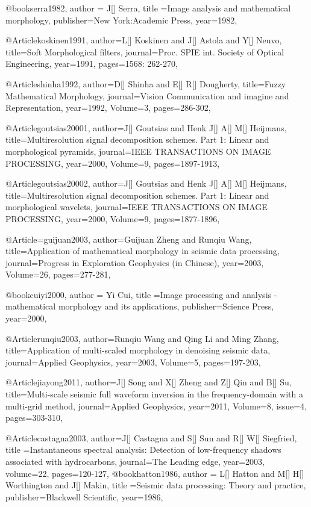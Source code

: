 @book{serra1982,
  author = {J[] Serra},
  title ={Image analysis and mathematical morphology},
  publisher={New York:Academic Press},
  year=1982,
}

@Article{koskinen1991,
  author={L[] Koskinen and J[] Astola and Y[] Neuvo},
  title={Soft Morphological filters},
  journal={Proc. SPIE int. Society of Optical Engineering},
  year=1991,
  pages={1568: 262-270},
}

@Article{shinha1992,
  author={D[] Shinha and E[] R[] Dougherty},
  title={Fuzzy Mathematical Morphology},
  journal={Vision Communication and imagine and Representation},
  year=1992,
  Volume=3,
  pages={286-302},
}

@Article{goutsias20001,
  author={J[] Goutsias and Henk J[] A[] M[] Heijmans},
  title={Multiresolution signal decomposition schemes. Part 1: Linear and morphological pyramids},
  journal={IEEE TRANSACTIONS ON IMAGE PROCESSING},
  year=2000,
  Volume=9,
  pages={1897-1913},
}

@Article{goutsias20002,
  author={J[] Goutsias and Henk J[] A[] M[] Heijmans},
  title={Multiresolution signal decomposition schemes. Part 1: Linear and morphological wavelets},
  journal={IEEE TRANSACTIONS ON IMAGE PROCESSING},
  year=2000,
  Volume=9,
  pages={1877-1896},
}

@Article={guijuan2003,
  author={Guijuan Zheng and Runqiu Wang},
  title={Application of mathematical morphology in seismic data processing},
  journal={Progress in Exploration Geophysics (in Chinese)},
  year=2003,
  Volume=26,
  pages={277-281},
}

@book{cuiyi2000,
  author = {Yi Cui},
  title ={Image processing and analysis - mathematical morphology and its applications},
  publisher={Science Press},
  year=2000,
}


@Article{runqiu2003,
  author={Runqiu Wang and Qing Li and Ming Zhang},
  title={Application of multi-scaled morphology in denoising seismic data},
  journal={Applied Geophysics},
  year=2003,
  Volume=5,
  pages={197-203},
}

@Article{jiayong2011,
  author={J[] Song and X[] Zheng and Z[] Qin and B[] Su},
  title={Multi-scale seismic full waveform inversion in the frequency-domain with a multi-grid method},
  journal={Applied Geophysics},
  year=2011,
  Volume=8,
  issue=4,
  pages={303-310},
}

@Article{castagna2003,
  author={J[] Castagna and S[] Sun and R[] W[] Siegfried},
  title ={Instantaneous spectral
analysis: Detection of low-frequency shadows associated with hydrocarbons},
  journal={The Leading edge},
  year=2003,
  volume=22,
  pages={120-127},
}
@book{hatton1986,
  author = {L[] Hatton and M[] H[] Worthington and J[] Makin},
  title ={Seismic data processing: Theory and practice},
  publisher={Blackwell Scientific},
  year=1986,
}

